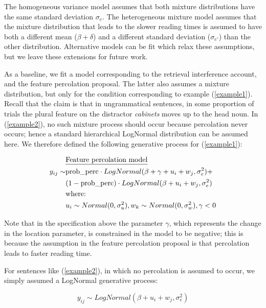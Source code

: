 \documentclass{cambridge7A}\usepackage[]{graphicx}\usepackage[]{color}
\begin{document}
The homogeneous variance model assumes that both mixture distributions have the same standard deviation $\sigma_e$.  The heterogeneous mixture model assumes that the mixture distribution that leads to the slower reading times is assumed to have both a different mean ($\beta+\delta$) and a different standard deviation ($\sigma_{e'}$) than the other distribution.
Alternative models can be fit which relax these assumptions, but we leave these extensions for future work.


As a baseline, we fit a model corresponding to the retrieval interference account,  and the 
feature percolation proposal. The latter also assumes a mixture distribution, but only for the condition corresponding to  example (\ref{example1}). Recall that the claim is that in ungrammatical sentences, in some proportion of trials the plural feature on the distractor \textit{cabinets} moves up to the head noun. In (\ref{example2}), no such mixture process should occur because percolation never occurs; hence a standard hierarchical LogNormal distribution can be assumed here. We therefore defined the following generative process for (\ref{example1}):

\begin{equation}
\begin{split}
       ~&\hbox{\underline{Feature percolation model}}\\
y_{ij} \sim& \hbox{prob\_perc} \cdot LogNormal(\beta+\gamma+u_i+w_j,\sigma_{e}^2)+\\
           ~& (1-\hbox{prob\_perc}) \cdot LogNormal(\beta+u_i+w_j,\sigma_e^2)\\
           ~& \hbox{where: }\\
           ~& u_i \sim Normal(0,\sigma_u^2), w_k \sim Normal(0,\sigma_w^2), \gamma < 0 \\ 
\end{split}
\end{equation}

\noindent
Note that in the specification above the parameter $\gamma$, which represents the change in the location parameter, is constrained in the model to be negative; this is because the assumption in the feature percolation proposal is that percolation leads to faster reading time.

For sentences like (\ref{example2}), in which no percolation is assumed to occur, we simply assumed a LogNormal generative process:

\begin{equation}
y_{ij} \sim LogNormal(\beta+u_i+w_j,\sigma_{e}^2)
\end{equation}
\end{document}
